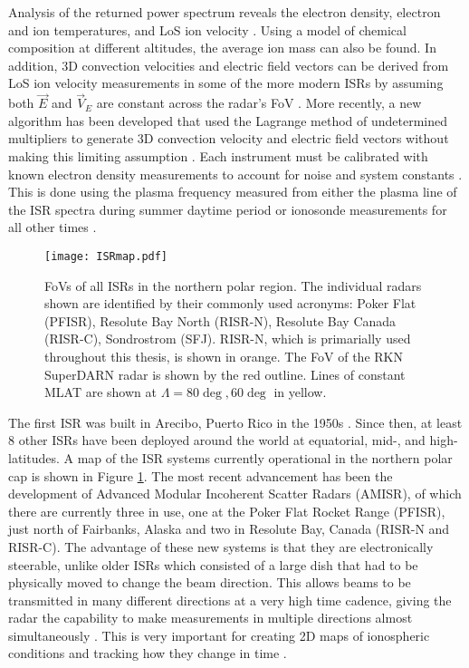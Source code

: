 Analysis of the returned power spectrum reveals the electron density, electron and ion temperatures, and LoS ion velocity \citep{Evans1969,Rishbeth1985,Nicolls2007a}.  Using a model of chemical composition at different altitudes, the average ion mass can also be found.  In addition, 3D convection velocities and electric field vectors can be derived from LoS ion velocity measurements in some of the more modern ISRs by assuming both \(\vec{E}\) and \(\vec{V}_E\) are constant across the radar's FoV \citep{Heinselman2008}.  More recently, a new algorithm has been developed that used the Lagrange method of undetermined multipliers to generate 3D convection velocity and electric field vectors without making this limiting assumption \citep{Nicolls2014}.  Each instrument must be calibrated with known electron density measurements to account for noise and system constants \citep{Nicolls2007a}.  This is done using the plasma frequency measured from either the plasma line of the ISR spectra during summer daytime period or ionosonde measurements for all other times \citep{Bahcivan2010,Themens2014}.

\begin{figure}
	\texttt{[image: ISRmap.pdf]}
	\caption[ISR map]{FoVs of all ISRs in the northern polar region.  The individual radars shown are identified by their commonly used acronyms: Poker Flat (PFISR), Resolute Bay North (RISR-N), Resolute Bay Canada (RISR-C), Sondrostrom (SFJ).  RISR-N, which is primarially used throughout this thesis, is shown in orange.  The FoV of the RKN SuperDARN radar is shown by the red outline.  Lines of constant MLAT are shown at \(\Lambda=80\deg,60\deg\) in yellow.}
	\label{fig:isrmap}
\end{figure}

The first ISR was built in Arecibo, Puerto Rico in the 1950s \citep{Gordon1958}.  Since then, at least 8 other ISRs have been deployed around the world at equatorial, mid-, and high-latitudes.  A map of the ISR systems currently operational in the northern polar cap is shown in Figure \ref{fig:isrmap}.  The most recent advancement has been the development of Advanced Modular Incoherent Scatter Radars (AMISR), of which there are currently three in use, one at the Poker Flat Rocket Range (PFISR), just north of Fairbanks, Alaska and two in Resolute Bay, Canada (RISR-N and RISR-C).  The advantage of these new systems is that they are electronically steerable, unlike older ISRs which consisted of a large dish that had to be physically moved to change the beam direction.  This allows beams to be transmitted in many different directions at a very high time cadence, giving the radar the capability to make measurements in multiple directions almost simultaneously \citep{Nicolls2007a,Nicolls2007b,Bahcivan2010}.  This is very important for creating 2D maps of ionospheric conditions and tracking how they change in time \citep{Semeter2009,Dahlgren2012a,Dahlgren2012b}.

